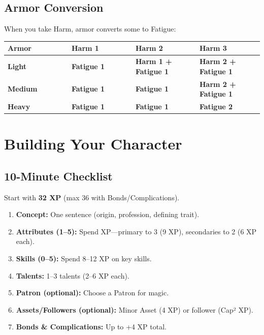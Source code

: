 \documentclass[10pt,twocolumn]{article} %
\begin{document}
\subsection{Armor Conversion}
When you take Harm, armor converts some to Fatigue:
\begin{coretable}
\begin{tabular}{>{\bfseries}p{0.25\linewidth} >{\bfseries}p{0.25\linewidth} >{\bfseries}p{0.25\linewidth} >{\bfseries}p{0.25\linewidth}}
\toprule
\textbf{Armor} & \textbf{Harm 1} & \textbf{Harm 2} & \textbf{Harm 3} \\
\midrule
Light & Fatigue 1 & Harm 1 + Fatigue 1 & Harm 2 + Fatigue 1 \\
Medium & Fatigue 1 & Fatigue 1 & Harm 2 + Fatigue 1 \\
Heavy & Fatigue 1 & Fatigue 1 & Fatigue 2 \\
\bottomrule
\end{tabular}
\end{coretable}

\section{Building Your Character}

\subsection{10-Minute Checklist}
Start with \textbf{32 XP} (max 36 with Bonds/Complications).
\begin{enumerate}[leftmargin=*]
    \item \textbf{Concept:} One sentence (origin, profession, defining trait).
    \item \textbf{Attributes (1--5):} Spend XP---primary to 3 (9 XP), secondaries to 2 (6 XP each).
    \item \textbf{Skills (0--5):} Spend 8--12 XP on key skills.
    \item \textbf{Talents:} 1--3 talents (2--6 XP each).
    \item \textbf{Patron (optional):} Choose a Patron for magic.
    \item \textbf{Assets/Followers (optional):} Minor Asset (4 XP) or follower (Cap² XP).
    \item \textbf{Bonds \& Complications:} Up to +4 XP total.
\end{enumerate}
\end{document}
